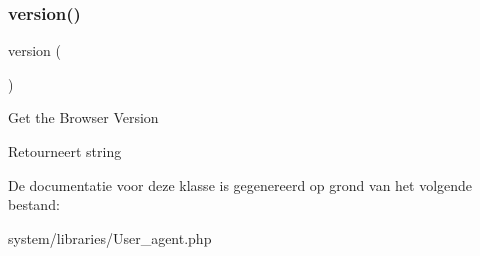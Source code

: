 \subsubsection{\texorpdfstring{version()}{version()}}
{\footnotesize\ttfamily version (\begin{DoxyParamCaption}{ }\end{DoxyParamCaption})}

Get the Browser Version

\begin{DoxyReturn}{Retourneert}
string 
\end{DoxyReturn}


De documentatie voor deze klasse is gegenereerd op grond van het volgende bestand\+:\begin{DoxyCompactItemize}
\item 
system/libraries/User\+\_\+agent.\+php\end{DoxyCompactItemize}

